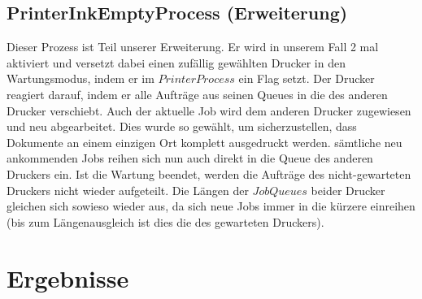 \documentclass[12pt,a4paper]{article}
\begin{document}
	\subsection{PrinterInkEmptyProcess (Erweiterung)}
	Dieser Prozess ist Teil unserer Erweiterung. Er wird in unserem Fall 2 mal aktiviert und versetzt dabei einen zufällig gewählten Drucker in den Wartungsmodus, indem er im $PrinterProcess$ ein Flag setzt. 
	Der Drucker reagiert darauf, indem er alle Aufträge aus seinen Queues in die des anderen Drucker verschiebt. Auch der aktuelle Job wird dem anderen Drucker zugewiesen und neu abgearbeitet. Dies wurde 
	so gewählt, um sicherzustellen, dass Dokumente an einem einzigen Ort komplett ausgedruckt werden. sämtliche neu ankommenden Jobs reihen sich nun auch direkt in die Queue des anderen Druckers
	ein. Ist die Wartung beendet, werden die Aufträge des nicht-gewarteten Druckers nicht wieder aufgeteilt. Die Längen der $JobQueues$ beider Drucker gleichen sich sowieso wieder aus, da sich neue Jobs
	immer in die kürzere einreihen (bis zum Längenausgleich ist dies die des gewarteten Druckers).
	
	\newpage
	\section{Ergebnisse}
	
	
\end{document}
